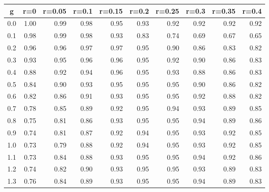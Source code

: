 %
\begin{table}[!tbp]
 \begin{center}
 \begin{tabular}{rrrrrrrrrr}\hline\hline
\multicolumn{1}{c}{g}&\multicolumn{1}{c}{r=0}&\multicolumn{1}{c}{r=0.05}&\multicolumn{1}{c}{r=0.1}&\multicolumn{1}{c}{r=0.15}&\multicolumn{1}{c}{r=0.2}&\multicolumn{1}{c}{r=0.25}&\multicolumn{1}{c}{r=0.3}&\multicolumn{1}{c}{r=0.35}&\multicolumn{1}{c}{r=0.4}\tabularnewline
\hline
0.0&1.00&0.99&0.98&0.95&0.93&0.92&0.92&0.92&0.92\tabularnewline
0.1&0.98&0.99&0.98&0.93&0.83&0.74&0.69&0.67&0.65\tabularnewline
0.2&0.96&0.96&0.97&0.97&0.95&0.90&0.86&0.83&0.82\tabularnewline
0.3&0.93&0.95&0.96&0.96&0.95&0.92&0.90&0.86&0.83\tabularnewline
0.4&0.88&0.92&0.94&0.96&0.95&0.93&0.88&0.86&0.83\tabularnewline
0.5&0.84&0.90&0.93&0.95&0.95&0.95&0.90&0.86&0.82\tabularnewline
0.6&0.82&0.86&0.91&0.93&0.95&0.95&0.92&0.88&0.82\tabularnewline
0.7&0.78&0.85&0.89&0.92&0.95&0.94&0.93&0.89&0.85\tabularnewline
0.8&0.75&0.81&0.86&0.93&0.95&0.95&0.94&0.89&0.86\tabularnewline
0.9&0.74&0.81&0.87&0.92&0.94&0.95&0.93&0.92&0.85\tabularnewline
1.0&0.73&0.79&0.88&0.92&0.94&0.95&0.93&0.92&0.85\tabularnewline
1.1&0.73&0.84&0.88&0.93&0.95&0.95&0.94&0.92&0.86\tabularnewline
1.2&0.74&0.82&0.90&0.93&0.95&0.95&0.93&0.89&0.83\tabularnewline
1.3&0.76&0.84&0.89&0.93&0.95&0.95&0.94&0.89&0.83\tabularnewline
\hline
\end{tabular}

\end{center}

\end{table}

